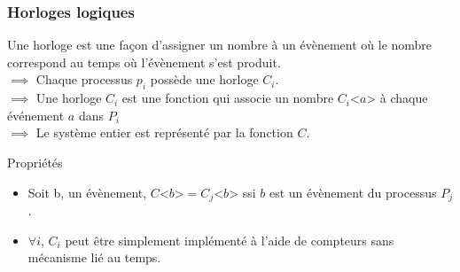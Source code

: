 \documentclass[compress]{beamer}
\begin{document}
\begin{frame}
\frametitle{Horloges logiques}
Une horloge est une façon d'assigner un nombre à un évènement où le nombre correspond au temps où l'évènement s'est produit.\\\bigskip
$\implies$ Chaque processus $p_i$ possède une horloge $C_i$.\\
$\implies$ Une horloge $C_i$ est une fonction qui associe un nombre $C_i$<$a$>  à chaque événement $a$ dans $P_i$\\
$\implies$ Le système entier est représenté par la fonction $C$.
\begin{block}{Propriétés}
\begin{itemize}
\item Soit b, un évènement, $C$<$b$>$ = C_j$<$b$> ssi $b$ est un évènement du processus $P_j$.\\
\item $\forall i$, $C_i$ peut être simplement implémenté à l'aide de compteurs sans mécanisme lié au temps.
\end{itemize} 
\end{block}
\end{frame}
\end{document}
